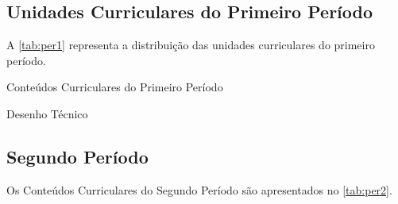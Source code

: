 

\newcommand{\nomedisciplina}{<nome>}

\newcommand{\perdisciplina}{<per>}

\newcommand{\coddisciplina}{-}

\newcommand{\areadisciplina}{-}

\newcommand{\moddisciplina}{-}

\newcommand{\extdisciplina}{-}

\newcommand{\ididisciplina}{-}

\newcommand{\chptdisciplina}{-}

\newcommand{\chppdisciplina}{-}

\newcommand{\chnptdisciplina}{-}

\newcommand{\chnppdisciplina}{-}

\newcommand{\chtdisciplina}{-}

\newcommand{\ementadisciplina}{-}


\subsection{Unidades Curriculares do Primeiro Período}

A \autoref{tab:per1} representa a distribuição das unidades curriculares do primeiro período.

\begin{table}[htb!]
	\centering\tiny
	\caption{Conteúdos Curriculares do Primeiro Período}
	\label{tab:per1}
		
\end{table}

\begin{quadro}[htb!]
	\centering\tiny
	\caption{Desenho Técnico}
	\label{tab:desenho}
		
\end{quadro}

\subsection{Segundo Período}

Os Conteúdos Curriculares do Segundo Período são apresentados no \autoref{tab:per2}.

